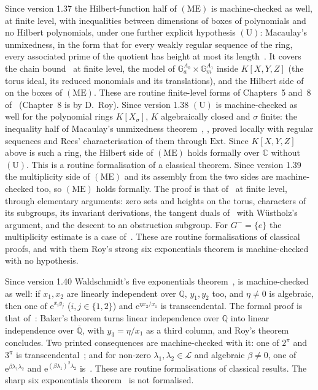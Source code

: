 \documentclass[11pt,a4paper]{article}
\theoremstyle{plain}
\theoremstyle{definition}
\newcommand{\e}{\mathrm{e}}
\newcommand{\Q}{\mathbb{Q}}
\newcommand{\Alg}{\overline{\mathbb{Q}}}
\newcommand{\Logs}{\mathcal{L}}
\begin{document}
Since version 1.37 the Hilbert-function half of $(\mathrm{ME})$ is machine-checked as well, at finite level, with
inequalities between dimensions of boxes of polynomials and no Hilbert polynomials, under one further explicit
hypothesis $(\mathrm{U})$: Macaulay's unmixedness, in the form that for every weakly regular sequence of the ring,
every associated prime of the quotient has height at most its length~\cite[\S8.2.1]{waldschmidt-book}. It covers
the chain bound~\cite[Theorem~8.8]{waldschmidt-book} at finite level, the model of
$\mathbb{G}_{a}^{A_{0}}\times\mathbb{G}_{m}^{A_{1}}$ inside $K[X,Y,Z]$ (the torus ideal, its reduced monomials and
its translations), and the Hilbert side of~\cite[Proposition~5.14]{waldschmidt-book} on the boxes of
$(\mathrm{ME})$. These are routine finite-level forms of Chapters~5 and~8 of~\cite{waldschmidt-book} (Chapter~8 is by D.~Roy).
Since version 1.38 $(\mathrm{U})$ is machine-checked as well for the polynomial rings $K[X_\sigma]$, $K$
algebraically closed and $\sigma$ finite: the inequality half of Macaulay's unmixedness
theorem~\cite{macaulay-1916}, \cite[Theorem~2.1.6]{bruns-herzog}, proved locally with regular sequences and Rees'
characterisation of them through $\mathrm{Ext}$. Since $K[X,Y,Z]$ above is such a ring, the Hilbert side of
$(\mathrm{ME})$ holds formally over $\mathbb{C}$ without $(\mathrm{U})$. This is a routine formalisation of a classical
theorem. Since version 1.39 the multiplicity side of $(\mathrm{ME})$ and its assembly from the two sides are
machine-checked too, so $(\mathrm{ME})$ holds formally. The proof is that of~\cite[\S8.4]{waldschmidt-book}
at finite level, through elementary arguments: zero sets and heights on the torus, characters of its
subgroups, its invariant derivations, the tangent duals of~\cite[Lemmas~8.14--8.16]{waldschmidt-book} with
W\"ustholz's argument, and the descent to an obstruction subgroup. For $G^{-}=\{e\}$ the multiplicity
estimate is a case of~\cite[Theorem~2.1]{philippon-1986}. These are routine formalisations of classical
proofs, and with them Roy's strong six exponentials theorem is machine-checked with no hypothesis.

Since version 1.40 Waldschmidt's five exponentials theorem~\cite[Corollary~2.2]{waldschmidt-1988},
\cite[\S11.3.3]{waldschmidt-book} is machine-checked as well: if $x_{1},x_{2}$ are linearly independent over $\Q$,
$y_{1},y_{2}$ too, and $\eta\neq0$ is algebraic, then one of $\e^{x_{i}y_{j}}$ ($i,j\in\{1,2\}$) and
$\e^{\eta x_{2}/x_{1}}$ is transcendental. The formal proof is that of~\cite[Remark after Corollary~11.16]{waldschmidt-book}:
Baker's theorem turns linear independence over $\Q$ into linear independence over $\Alg$, with $y_{3}=\eta/x_{1}$ as a
third column, and Roy's theorem concludes. Two printed consequences are machine-checked with it: one of $2^{\pi}$
and $3^{\pi}$ is transcendental~\cite[(2.2.3)]{waldschmidt-1988}; and for non-zero $\lambda_{1},\lambda_{2}\in\Logs$
and algebraic $\beta\neq0$, one of $\e^{\beta\lambda_{1}\lambda_{2}}$ and $\e^{(\beta\lambda_{1})^{2}\lambda_{2}}$
is~\cite[Exercise~11.8(b)]{waldschmidt-book}. These are routine formalisations of classical results. The sharp six
exponentials theorem~\cite[Corollary~2.1]{waldschmidt-1988} is not formalised.
\end{document}
